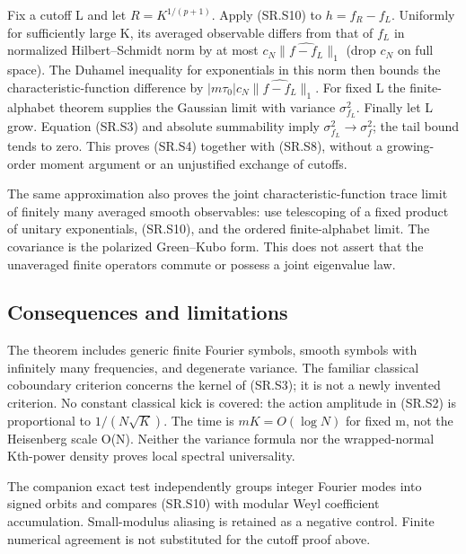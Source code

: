 Fix a cutoff L and let \(R=K^{1/(p+1)}\). Apply (SR.S10) to \(h=f_R-f_L\). Uniformly for sufficiently large K, its averaged observable differs from that of \(f_{L}\) in normalized Hilbert--Schmidt norm by at most \(c_N\|\widehat{f-f_L}\|_1\) (drop \(c_{N}\) on full space). The Duhamel inequality for exponentials in this norm then bounds the characteristic-function difference by \(|m\tau_0|c_N\|\widehat{f-f_L}\|_1\). For fixed L the finite-alphabet theorem supplies the Gaussian limit with variance \(\sigma_{f_L}^2\). Finally let L grow. Equation (SR.S3) and absolute summability imply \(\sigma_{f_L}^2\to\sigma_f^2\); the tail bound tends to zero. This proves (SR.S4) together with (SR.S8), without a growing-order moment argument or an unjustified exchange of cutoffs.

The same approximation also proves the joint characteristic-function trace limit of finitely many averaged smooth observables: use telescoping of a fixed product of unitary exponentials, (SR.S10), and the ordered finite-alphabet limit. The covariance is the polarized Green--Kubo form. This does not assert that the unaveraged finite operators commute or possess a joint eigenvalue law.

\subsection{Consequences and limitations}\label{smooth:consequences-and-limitations}

The theorem includes generic finite Fourier symbols, smooth symbols with infinitely many frequencies, and degenerate variance. The familiar classical coboundary criterion concerns the kernel of (SR.S3); it is not a newly invented criterion. No constant classical kick is covered: the action amplitude in (SR.S2) is proportional to \(1/(N\sqrt K)\). The time is \(mK=O(\log N)\) for fixed m, not the Heisenberg scale O(N). Neither the variance formula nor the wrapped-normal Kth-power density proves local spectral universality.

The companion exact test independently groups integer Fourier modes into signed orbits and compares (SR.S10) with modular Weyl coefficient accumulation. Small-modulus aliasing is retained as a negative control. Finite numerical agreement is not substituted for the cutoff proof above.
